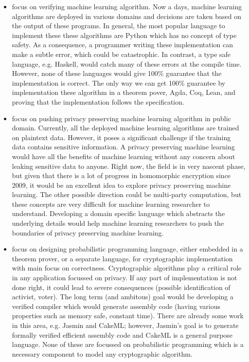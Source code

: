 \documentclass[a4paper]{article}
\begin{document}
\begin{itemize}

\item focus on verifying machine learning algorithm. Now a days, machine learning algorithms are deployed 	
in various domains and decisions are taken based on the output of these programs. In general, 
the most popular language to implement these these algorithms are Python which has 
no concept of type safety. As a consequence, a programmer writing these implementation can make 
a subtle error, which could be catastrophic.  In contrast, a type safe language, e.g. Haskell, 
would catch many of these errors at the compile time. However, none of these languages would 
give 100\% guarantee that the implementation is correct. The only way we can get 100\% guarantee  
by implementation these algorithm in a theorem pover, Agda, Coq, Lean,  and proving that 
the implementation follows the specification.  

\item focus on pushing privacy preserving machine learning algorithm in public domain. 
Currently, all the deployed machine learning algorithms are trained on plaintext data. 
However, it poses a significant challenge if the training data contains  sensitive information.
A privacy preserving machine learning would have all the benefits of machine learning without 
any concern about leaking sensitive data to anyone. Right now, the field is in very nascent phase, 
but given that there is a lot of progress in homomorphic encryption since 2009, it would be 
an excellent idea to explore privacy preserving machine learning. The other possible direction could be
multi-party computation, but these concepts are very 
difficult for machine learning researcher to understand.  Developing a domain specific language which 
abstracts the underlying details would help machine learning researchers to push the boundaries of 
privacy preserving machine learning. 

\item focus on designing probabilistic programming language, either embedded in a theorem prover, or 
 a separate language, for 
	cryptographic implementation with main focus on correctness. Cryptographic algorithms 
	play a critical role in any application focussed on privacy. 
	If any part of implementation is not done right, it could lead to severe consequences 
	(possible identification of activist, voter). The long term (and ambitous) goal would be
	developing a verified compiler which would generate assembly code (having various properties such as 
	memory safe, constant time). There are already some 
	work in this area, e.g. Jasmin and CakeML; however,  Jasmin's goal is 
	to generate formally verified efficient assembly code and CakeML is a general purpose 
	language. None of these are focussed on probabilistic programming which is a 
	necessary component to model any cryptographic algorithm.




\end{itemize}
\end{document}
